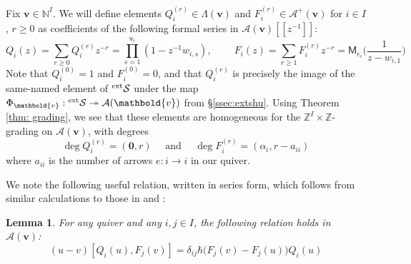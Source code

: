 \documentclass[11pt,reqno]{amsart}
\renewcommand{\mathbf}{\mathbold}
\numberwithin{equation}{section}
\newtheorem{Lemma}[equation]{Lemma}
\theoremstyle{definition}
\newcommand{\cA}{\mathcal{A}}
\newcommand{\cS}{\mathcal{S}}
\newcommand{\bv}{\mathbf{v}}
\newcommand{\NN}{\mathbb{N}}
\newcommand{\ZZ}{\mathbb{Z}}
\newcommand{\leftexp}[2]{\vphantom{#2}^{#1} #2}
\renewcommand{\bv}{\mathbf{v}} %
\newcommand{\sv}{\mathsf{v}}
\newcommand{\M}{\mathsf{M}}
\newcommand{\vertexset}{I}
\newcommand{\GT}{\Lambda}
\newcommand{\qzast}{\cA}
\newcommand{\qzastplus}{\cA^{+}}
\newcommand{\extshu}{\leftexp{\mathrm{ext}}{\cS}}
\begin{document}
Fix $\bv \in \NN^\vertexset$. We will define elements $Q_i^{(r)} \in \GT(\bv)$ and $ F_i^{(r)} \in \qzastplus(\bv)$ for $i\in \vertexset$, $r\geq0$ as coefficients of the following formal series in $\qzast(\bv)[\![z^{-1}]\!]$:
\begin{equation}
    Q_i(z)= \sum_{r\geq 0} Q_i^{(r)} z^{-r} =  \prod_{s=1}^{\sv_i} (1-z^{-1} w_{i,s}), \qquad   \   F_i(z) = \sum_{r \geq 1} F_i^{(r)} z^{-r} = \M_{e_i}\Big(\frac{1}{z-w_{i,1}}\Big)
\end{equation}
Note that $Q_i^{(0)} = 1$ and $F_i^{(0)} = 0$, and that $Q_i^{(r)}$ is precisely the image of the same-named element of $\extshu$ under the map $\Phi_\bv:\extshu\twoheadrightarrow\qzast(\bv)$ from \S \ref{ssec:extshu}.  Using Theorem \ref{thm: grading}, we see that  these elements are homogeneous for the $\ZZ^\vertexset\times\ZZ$-grading on $\qzast(\bv)$, with  degrees 
    \begin{equation}
        \label{eq:QandFdegrees}
        \deg Q_i^{(r)} = (\mathbf{0}, r) \quad \text{ and } \quad \deg F_i^{(r)} = (\alpha_i, r-a_{ii})
    \end{equation}
    where $a_{ii}$ is the number of arrows $e:i \rightarrow i$ in our quiver.  

We note the following useful relation, written in series form, which follows from similar  calculations to those in \cite[\S B(iii)]{BFN1} and \cite[\S C(iv)]{FT}:
\begin{Lemma}
    \label{lem:QFrels1}
    For any quiver and any $i,j \in \vertexset$, the following relation holds in $\qzast(\bv)$:
    $$
    (u-v)[Q_i(u), F_j(v)] = \delta_{ij} \hbar \big( F_j(v) - F_j(u) \big) Q_i(u)
    $$
\end{Lemma}
\end{document}
